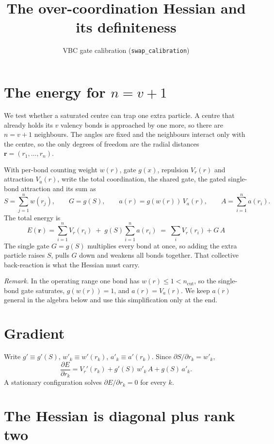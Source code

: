 \documentclass[11pt]{article}
\title{The over-coordination Hessian and its definiteness}
\author{VBC gate calibration \quad (\texttt{swap\_calibration})}
\date{}
\newcommand{\rvec}{\mathbf{r}}
\begin{document}
\maketitle

\section{The energy for $n=v+1$}

We test whether a saturated centre can trap one extra particle. A centre that already
holds its $v$ valency bonds is approached by one more, so there are $n=v+1$ neighbours.
The angles are fixed and the neighbours interact only with the centre, so the only degrees
of freedom are the radial distances $\rvec=(r_1,\dots,r_n)$.

With per-bond counting weight $w(r)$, gate $g(x)$, repulsion $V_r(r)$ and attraction
$V_a(r)$, write the total coordination, the shared gate, the gated single-bond attraction
and its sum as
\[
S=\sum_{j=1}^{n} w(r_j),\qquad
G=g(S),\qquad
a(r)=g\!\left(w(r)\right)\,V_a(r),\qquad
A=\sum_{i=1}^{n} a(r_i).
\]
The total energy is
\[
\boxed{\;E(\rvec)=\sum_{i=1}^{n} V_r(r_i)\;+\;g(S)\sum_{i=1}^{n} a(r_i)\;=\;\sum_i V_r(r_i)+G\,A\;}
\]
The single gate $G=g(S)$ multiplies every bond at once, so adding the extra particle raises
$S$, pulls $G$ down and weakens all bonds together. That collective back-reaction is what
the Hessian must carry.

\medskip
\noindent\textit{Remark.} In the operating range one bond has $w(r)\le 1<n_{\mathrm{cut}}$,
so the single-bond gate saturates, $g(w(r))=1$, and $a(r)=V_a(r)$. We keep $a(r)$ general
in the algebra below and use this simplification only at the end.

\section{Gradient}

Write $g'\equiv g'(S)$, $w'_k\equiv w'(r_k)$, $a'_k\equiv a'(r_k)$. Since
$\partial S/\partial r_k=w'_k$,
\[
\frac{\partial E}{\partial r_k}=V_r'(r_k)+g'(S)\,w'_k\,A+g(S)\,a'_k .
\]
A stationary configuration solves $\partial E/\partial r_k=0$ for every $k$.

\section{The Hessian is diagonal plus rank two}
\end{document}
